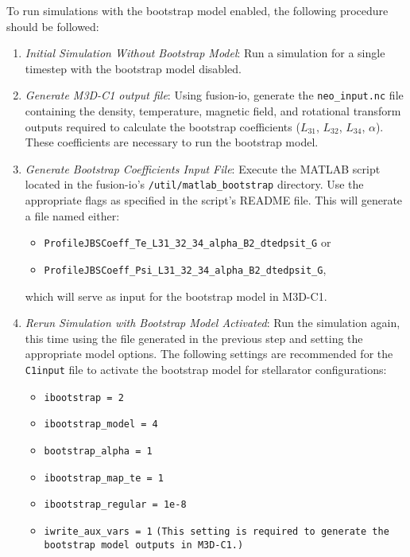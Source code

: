 \noindent
To run simulations with the bootstrap model enabled, the following procedure should be followed: 
\begin{enumerate}
    \item \textit{Initial Simulation Without Bootstrap Model}:  
    Run a simulation for a single timestep with the bootstrap model disabled. 

    \item \textit{Generate M3D-C1 output file}:  
    Using fusion-io, generate the \texttt{neo\_input.nc} file containing the density, temperature, magnetic field, and rotational transform outputs required to calculate the bootstrap coefficients ($L_{31}$, $L_{32}$, $L_{34}$, $\alpha$). These coefficients are necessary to run the bootstrap model.

    \item \textit{Generate Bootstrap Coefficients Input File}:  
    Execute the MATLAB script located in the fusion-io's \texttt{/util/matlab\_bootstrap} directory. Use the appropriate flags as specified in the script's README file.  
    This will generate a file named either:
    \begin{itemize}
        \item \texttt{ProfileJBSCoeff\_Te\_L31\_32\_34\_alpha\_B2\_dtedpsit\_G} or 
        \item \texttt{ProfileJBSCoeff\_Psi\_L31\_32\_34\_alpha\_B2\_dtedpsit\_G},
    \end{itemize}
    which will serve as input for the bootstrap model in M3D-C1.

    \item \textit{Rerun Simulation with Bootstrap Model Activated}:  
    Run the simulation again, this time using the file generated in the previous step and setting the appropriate model options. The following settings are recommended for the \texttt{C1input} file to activate the bootstrap model for stellarator configurations:
    \begin{itemize}
        \item \texttt{ibootstrap = 2}
        \item \texttt{ibootstrap\_model = 4}  
        \item \texttt{bootstrap\_alpha = 1}  
        \item \texttt{ibootstrap\_map\_te = 1}  
        \item \texttt{ibootstrap\_regular = 1e-8}  
        \item \texttt{iwrite\_aux\_vars = 1} \texttt{(This setting is required to generate the bootstrap model outputs in M3D-C1.)}
    \end{itemize}
\end{enumerate}

